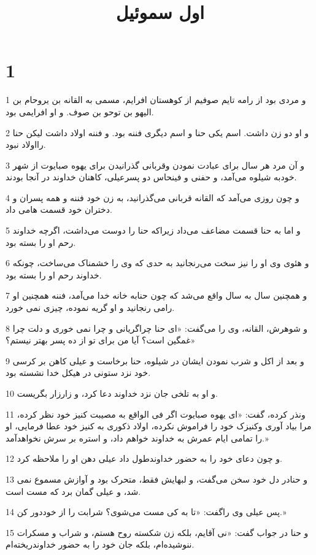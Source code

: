

\title{اول سموئيل}

 
\chapter{1}

\par 1 و مردی بود از رامه تایم صوفیم از کوهستان افرایم، مسمی به القانه بن یروحام بن الیهو بن توحو بن صوف. و او افرایمی بود.
\par 2 و او دو زن داشت. اسم یکی حنا و اسم دیگری فننه بود. و فننه اولاد داشت لیکن حنا رااولاد نبود.
\par 3 و آن مرد هر سال برای عبادت نمودن وقربانی گذرانیدن برای یهوه صبایوت از شهر خودبه شیلوه می‌آمد، و حفنی و فینحاس دو پسرعیلی، کاهنان خداوند در آنجا بودند.
\par 4 و چون روزی می‌آمد که القانه قربانی می‌گذرانید، به زن خود فننه و همه پسران و دختران خود قسمت هامی داد.
\par 5 و اما به حنا قسمت مضاعف می‌داد زیراکه حنا را دوست می‌داشت، اگر‌چه خداوند رحم او را بسته بود.
\par 6 و هئوی وی او را نیز سخت می‌رنجانید به حدی که وی را خشمناک می‌ساخت، چونکه خداوند رحم او را بسته بود.
\par 7 و همچنین سال به سال واقع می‌شد که چون حنابه خانه خدا می‌آمد، فننه همچنین او رامی رنجانید و او گریه نموده، چیزی نمی خورد.
\par 8 و شوهرش، القانه، وی را می‌گفت: «ای حنا چراگریانی و چرا نمی خوری و دلت چرا غمگین است؟ آیا من برای تو از ده پسر بهتر نیستم؟»
\par 9 و بعد از اکل و شرب نمودن ایشان در شیلوه، حنا برخاست و عیلی کاهن بر کرسی خود نزد ستونی در هیکل خدا نشسته بود.
\par 10 و او به تلخی جان نزد خداوند دعا کرد، و زارزار بگریست.
\par 11 ونذر کرده، گفت: «ای یهوه صبایوت اگر فی الواقع به مصیبت کنیز خود نظر کرده، مرا بیاد آوری وکنیزک خود را فراموش نکرده، اولاد ذکوری به کنیز خود عطا فرمایی، او را تمامی ایام عمرش به خداوند خواهم داد، و استره بر سرش نخواهدآمد.»
\par 12 و چون دعای خود را به حضور خداوندطول داد عیلی دهن او را ملاحظه کرد.
\par 13 و حنادر دل خود سخن می‌گفت، و لبهایش فقط، متحرک بود و آوازش مسموع نمی شد، و عیلی گمان برد که مست است.
\par 14 پس عیلی وی راگفت: «تا به کی مست می‌شوی؟ شرابت را از خوددور کن.»
\par 15 و حنا در جواب گفت: «نی آقایم، بلکه زن شکسته روح هستم، و شراب و مسکرات ننوشیده‌ام، بلکه جان خود را به حضور خداوندریخته‌ام.
